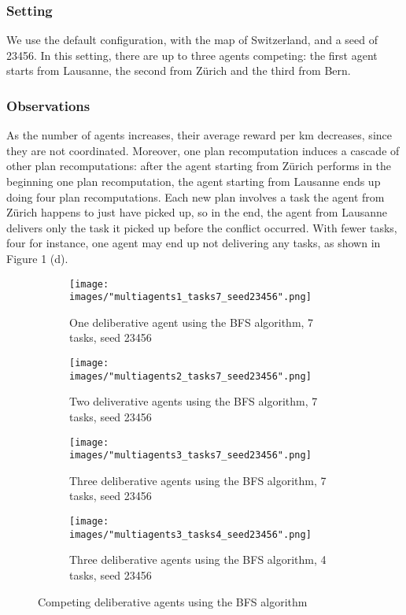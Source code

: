 \documentclass[10pt]{article}
\begin{document}
\subsubsection{Setting}
We use the default configuration, with the map of Switzerland, and a seed of 23456. In this setting, there are up to three agents competing: the first agent starts from Lausanne, the second from Z\"urich and the third from Bern.

\subsubsection{Observations}
As the number of agents increases, their average reward per km decreases, since they are not coordinated.
Moreover, one plan recomputation induces a cascade of other plan recomputations: after the agent starting from Z\"urich performs in the beginning one plan recomputation, the agent starting from Lausanne ends up doing four plan recomputations. Each new plan involves a task the agent from Z\"urich happens to just have picked up, so in the end, the agent from Lausanne delivers only the task it picked up before the conflict occurred.
With fewer tasks, four for instance, one agent may end up not delivering any tasks, as shown in Figure 1 (d).


\begin{figure}[h!]
\centering
\begin{subfigure}[t]{0.24\textwidth}
\captionsetup{width=1.0\textwidth}
\texttt{[image: images/"multiagents1\_tasks7\_seed23456".png]}
\caption{One deliberative agent using the BFS algorithm, 7 tasks, seed 23456}
\end{subfigure}
\hfill
\begin{subfigure}[t]{0.24\textwidth}
\captionsetup{width=1.0\textwidth}
\texttt{[image: images/"multiagents2\_tasks7\_seed23456".png]}
\caption{Two deliverative agents using the BFS algorithm, 7 tasks, seed 23456}
\end{subfigure}
\hfill
\begin{subfigure}[t]{0.24\textwidth}
\captionsetup{width=1.0\textwidth}
\texttt{[image: images/"multiagents3\_tasks7\_seed23456".png]}
\caption{Three deliberative agents using the BFS algorithm, 7 tasks, seed 23456}
\end{subfigure}
\hfill
\begin{subfigure}[t]{0.24\textwidth}
\captionsetup{width=1.0\textwidth}
\texttt{[image: images/"multiagents3\_tasks4\_seed23456".png]}
\caption{Three deliberative agents using the BFS algorithm, 4 tasks, seed 23456}
\end{subfigure}
\caption{Competing deliberative agents using the BFS algorithm}
\label{discount factor}
\end{figure}
\end{document}
